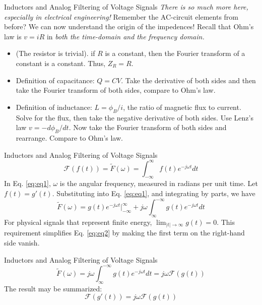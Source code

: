 \documentclass{beamer}
\begin{document}
\begin{frame}[fragile]{Inductors and Analog Filtering of Voltage Signals}
\small
\textit{\alert{There is so much more here, especially in electrical engineering!}} Remember the AC-circuit elements from before? We can now understand the origin of the impedences!  Recall that Ohm's law is $v = i R$ in \textit{both the time-domain and the frequency domain.}
\begin{itemize}
\item (The resistor is trivial). if $R$ is a constant, then the Fourier transform of a constant is a constant.  Thus, $Z_R = R$.
\item Definition of capacitance: $Q = CV$.  Take the derivative of both sides and then take the Fourier transform of both sides, compare to Ohm's law.
\item Definition of inductance: $L = \phi_B/i$, the ratio of magnetic flux to current. Solve for the flux, then take the negative derivative of both sides.  Use Lenz's law $v = -d\phi_B/dt$.  Now take the Fourier transform of both sides and rearrange.  Compare to Ohm's law.
\end{itemize}
\end{frame}

\begin{frame}{Inductors and Analog Filtering of Voltage Signals}
\small
\begin{equation}
\mathcal{F}(f(t)) = \tilde{F}(\omega) = \int_{-\infty}^{\infty} f(t) e^{-j\omega t} dt
\label{eq:eq1}
\end{equation}
In Eq. \ref{eq:eq1}, $\omega$ is the angular frequency, measured in radians per unit time.  Let $f(t) = g'(t)$.  Substituting into Eq. \ref{eq:eq1}, and integrating by parts, we have
\begin{equation}
\tilde{F}(\omega) = g(t) e^{-j\omega t} |_{-\infty}^{\infty} + j\omega \int_{\infty}^{-\infty} g(t)  e^{-j\omega t} dt
\label{eq:eq2}
\end{equation}
For physical signals that represent finite energy, $\lim_{|t|\rightarrow\infty} g(t) = 0$.  This requirement simplifies Eq. \ref{eq:eq2} by making the first term on the right-hand side vanish.
\end{frame}

\begin{frame}{Inductors and Analog Filtering of Voltage Signals}
\small
\begin{equation}
\tilde{F}(\omega) = j\omega \int_{\infty}^{-\infty} g(t)  e^{-j\omega t} dt = j\omega\mathcal{F}(g(t))
\end{equation}
The result may be summarized:
\begin{equation}
\boxed{
\mathcal{F}(g'(t)) = j\omega\mathcal{F}(g(t))
}
\end{equation}
\end{frame}
\end{document}

